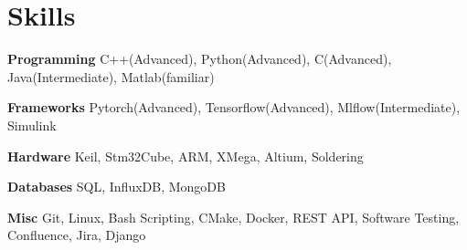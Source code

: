 
\section{Skills}
  \vspace{2pt}
  \resumeSubHeadingListStart
    \small{\item{

    \textbf{\color{MidnightBlue}Programming}{ C++(Advanced), Python(Advanced), C(Advanced), Java(Intermediate), Matlab(familiar)} \\ \vspace{3pt}

    \textbf{\color{MidnightBlue}Frameworks}{ Pytorch(Advanced), Tensorflow(Advanced), Mlflow(Intermediate)}, Simulink \\ \vspace{3pt}


    \textbf{\color{MidnightBlue}Hardware}{ Keil, Stm32Cube, ARM, XMega, Altium, Soldering} \\ \vspace{3pt}

    \textbf{\color{MidnightBlue}Databases}{ SQL, InfluxDB, MongoDB} \\ \vspace{3pt}

    \textbf{\color{MidnightBlue}Misc}{ Git, Linux, Bash Scripting, CMake, Docker, REST API, Software Testing, Confluence, Jira, Django} \\ \vspace{3pt}
            
    }}
  \resumeSubHeadingListEnd
